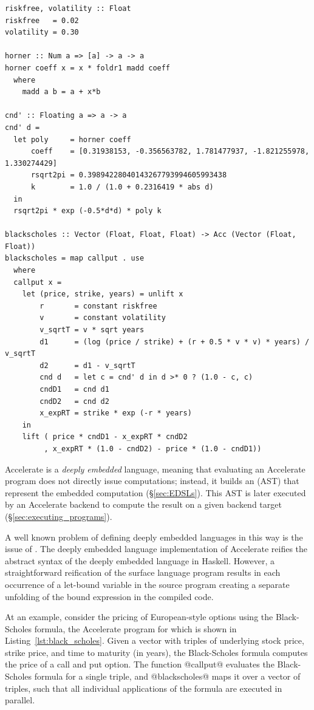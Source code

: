 \begin{lstlisting}[style=haskell_float
    ,float=t
    ,label=lst:black_scholes
    ,caption={Black-Scholes option pricing}]
riskfree, volatility :: Float
riskfree   = 0.02
volatility = 0.30

horner :: Num a => [a] -> a -> a
horner coeff x = x * foldr1 madd coeff
  where
    madd a b = a + x*b

cnd' :: Floating a => a -> a
cnd' d =
  let poly     = horner coeff
      coeff    = [0.31938153, -0.356563782, 1.781477937, -1.821255978, 1.330274429]
      rsqrt2pi = 0.39894228040143267793994605993438
      k        = 1.0 / (1.0 + 0.2316419 * abs d)
  in
  rsqrt2pi * exp (-0.5*d*d) * poly k

blackscholes :: Vector (Float, Float, Float) -> Acc (Vector (Float, Float))
blackscholes = map callput . use
  where
  callput x =
    let (price, strike, years) = unlift x
        r       = constant riskfree
        v       = constant volatility
        v_sqrtT = v * sqrt years
        d1      = (log (price / strike) + (r + 0.5 * v * v) * years) / v_sqrtT
        d2      = d1 - v_sqrtT
        cnd d   = let c = cnd' d in d >* 0 ? (1.0 - c, c)
        cndD1   = cnd d1
        cndD2   = cnd d2
        x_expRT = strike * exp (-r * years)
    in
    lift ( price * cndD1 - x_expRT * cndD2
         , x_expRT * (1.0 - cndD2) - price * (1.0 - cndD1))
\end{lstlisting}

Accelerate is a \emph{deeply embedded} language, meaning that evaluating an
Accelerate program does not directly issue computations; instead, it builds an
 (AST) that represent the embedded computation
(\S\ref{sec:EDSLs}). This AST is later executed by an Accelerate backend to
compute the result on a given backend target (\S\ref{sec:executing_programs}).

A well known problem of defining deeply embedded languages in this way is the
issue of . The deeply embedded language implementation of
Accelerate reifies the abstract syntax of the deeply embedded language in
Haskell. However, a straightforward reification of the surface language program
results in each occurrence of a let-bound variable in the source program
creating a separate unfolding of the bound expression in the compiled code.

At an example, consider the pricing of European-style options using the Black-Scholes formula, the
Accelerate program for which is shown in Listing~\ref{lst:black_scholes}. Given a vector with
triples of underlying stock price, strike price, and time to maturity (in years), the Black-Scholes
formula computes the price of a call and put option. The function @callput@ evaluates the
Black-Scholes formula for a single triple, and @blackscholes@ maps it over a vector of triples,
such that all individual applications of the formula are executed in parallel.

